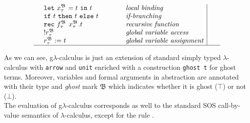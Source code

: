 \begin{figure}[H]
\begin{displaymath}
\begin{array}{ll@{\hspace*{-0.1cm}}l@{\hspace*{1.5cm} }l|@{\hspace*{0.5cm}}llll}
  	
   	& \mathtt{let} ~ \gvar{x}{}{} = t~ \mathtt{in}~ t    & &  
   								  \textit{local binding}   &       \\
   		
   								   
   	&  	\mathtt{if}~t~\mathtt{then}~t~\mathtt{else}~t    & &    
   								  \textit{if-branching}    &       \\
   		
   								      								   
   	&	\mathtt{rec} ~ \gvar{f}{}{} ~ \gvar{x}{}{}. t    &
   								   &  \textit{recursive function}  \\
   	
   	   		
   	   								      								   
   	&  	\mathtt{!}\gvar{r}{}{} & &  \textit{global variable access}\\   					
   	   
   	&  	\gvar{r}{}{} := t  &    &  \textit{global variable assignment}\\		 \hline						   
   								   
% 
  \end{array} 
\end{displaymath} 
\end{figure}

As we can see, g$\lambda$-calculus is just an extension of standard simply 
typed $\lambda$-calculus with \texttt{arrow} and \texttt{unit} enriched
with a construction \texttt{ghost t} for ghost terms. 
Moreover, variables and formal arguments in abstraction are annotated with
their type and \textit{ghost} mark $\mathfrak{B}$ which indicates whether 
it is ghost ($\top$) or not ($\bot$). \\

The evaluation of g$\lambda$-calculus corresponds as well to the standard SOS call-by-value semantics of $\lambda$-calculus, except for the rule  .

